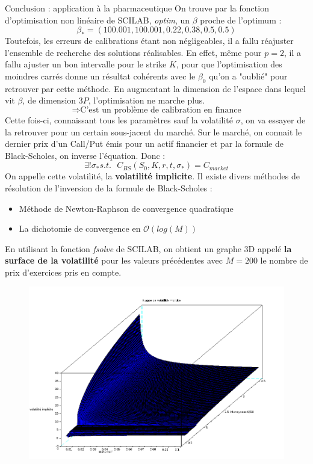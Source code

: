 \documentclass[final]{beamer}
\newlength{\onecolwid}
\begin{document}
\begin{frame}[t]
\begin{columns}[t]
\begin{column}{\onecolwid}
\begin{block}{Conclusion : application à la pharmaceutique}
  On trouve par la fonction d'optimisation non linéaire de SCILAB, \textit{optim}, un $\beta$ proche de l'optimum :
  $$ \beta_* = (100.001,100.001,0.22,0.38,0.5,0.5) $$
  Toutefois, les erreurs de calibrations étant non négligeables, il a fallu réajuster l'ensemble de recherche des solutions réalisables.
  En effet, même pour $p=2$, il a fallu ajuster un bon intervalle pour le strike $K$, pour que l'optimisation des moindres carrés donne un résultat cohérents avec le $\beta_0$ qu'on a "oublié" pour retrouver par cette méthode.
  \newline
  En augmentant la dimension de l'espace dans lequel vit $\beta$, de dimension $3P$, l'optimisation ne marche plus.
  $$ \Rightarrow \text{C'est un problème de calibration en finance} $$
  Cette fois-ci, connaissant tous les paramètres sauf la volatilité $\sigma$, on va essayer de la retrouver pour un certain sous-jacent du marché. \newline
  Sur le marché, on connait le dernier prix d'un Call/Put émis pour un actif financier et par la formule de Black-Scholes, on inverse l'équation.
  \newline Donc :
  $$ \exists ! \sigma_* s.t. \ \ \ C_{BS}(S_0,K,r,t,\sigma_*) = C_{market} $$
  On appelle cette volatilité, la \textbf{volatilité implicite}.
  Il existe divers méthodes de résolution de l'inversion de la formule de Black-Scholes :
  \begin{itemize}
    \item Méthode de Newton-Raphson de convergence quadratique
    \item La dichotomie de convergence en $\mathcal{O}(log(M))$
  \end{itemize}
  En utilisant la fonction \textit{fsolve} de SCILAB, on obtient un graphe 3D appelé \textbf{la surface de la volatilité} pour les valeurs précédentes avec $M=200$ le nombre de prix d'exercices pris en compte.
    \begin{figure}
      \includegraphics[scale=0.20]{volimpl1.png}
    \end{figure}


\end{block}
\end{column}
\end{columns}
\end{frame}
\end{document}
